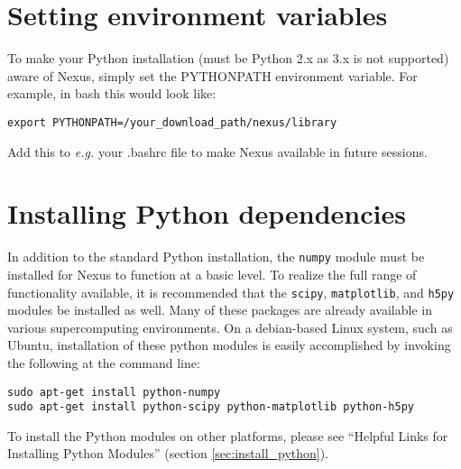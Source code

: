\documentclass[oneside,11pt]{memoir}
\numberwithin{equation}{section}
\begin{document}


\section{Setting environment variables}
To make your Python installation (must be Python 2.x as 3.x is not supported) 
aware of Nexus, simply set the PYTHONPATH environment variable.  For example, in bash this would look like:
\begin{shaded}
\begin{verbatim}
export PYTHONPATH=/your_download_path/nexus/library
\end{verbatim}
\end{shaded}
\noindent
Add this to \emph{e.g.} your .bashrc file to make Nexus available 
in future sessions.

\section{Installing Python dependencies}
In addition to the standard Python installation, the \texttt{numpy} module must 
be installed for Nexus to function at a basic level.  To realize 
the full range of functionality available, it is recommended that the 
\texttt{scipy}, \texttt{matplotlib}, and \texttt{h5py} modules be installed as 
well.  Many of these packages are already available in various supercomputing 
environments.  On a debian-based Linux system, such as Ubuntu, installation of 
these python modules is easily accomplished by invoking the following at the 
command line:
\begin{shaded}
\begin{verbatim}
sudo apt-get install python-numpy
sudo apt-get install python-scipy python-matplotlib python-h5py 
\end{verbatim}
\end{shaded}
\noindent
To install the Python modules on other platforms, please see 
``Helpful Links for Installing Python Modules'' (section \ref{sec:install_python}).
\end{document}
